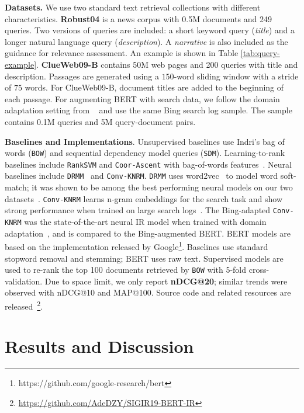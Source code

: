 \documentclass[sigconf]{acmart}
\begin{document}
\textbf{Datasets.} We use two standard text retrieval collections with different characteristics. \textbf{Robust04} is a news corpus with 0.5M documents and 249 queries. Two versions of queries are included: a short keyword query (\textit{title}) and a longer natural language query (\textit{description}). A \textit{narrative} is also included as the guidance for relevance assessment. An example is shown in Table \ref{tab:query-example}. \textbf{ClueWeb09-B} contains 50M web pages and 200 queries with title and description. Passages are generated using a $150$-word sliding window with a stride of $75$ words. For ClueWeb09-B, document titles are added to the beginning of each passage. For augmenting BERT with search data, we follow the domain adaptation setting from ~\citet{dai2018convolutional} and use the same Bing search log sample. The sample contains 0.1M queries and 5M query-document pairs.

\textbf{Baselines and Implementations}. Unsupervised baselines use Indri's bag of words (\texttt{BOW}) and sequential dependency model queries (\texttt{SDM}). 
Learning-to-rank baselines include \texttt{RankSVM} and \texttt{Coor-Ascent} with bag-of-words features~\cite{dai2018convolutional}. Neural baselines include \texttt{DRMM}~\cite{DRMM} and \texttt{Conv-KNRM}. \texttt{DRMM} uses word2vec~\cite{word2vec} to model word soft-match; it was shown to be among the best performing neural models on our two datasets~\cite{DRMM}. \texttt{Conv-KNRM} learns n-gram embeddings for the search task and show strong performance when 
trained on large search logs~\cite{dai2018convolutional}.  The Bing-adapted \texttt{Conv-KNRM} was the state-of-the-art neural IR model when trained with domain adaptation~\cite{dai2018convolutional}, and is compared to the Bing-augmented BERT. BERT models are based on the implementation released by Google\footnote{https://github.com/google-research/bert}. Baselines use standard stopword removal and stemming; BERT uses raw text. Supervised models are used to re-rank the top 100 documents retrieved by \texttt{BOW} with 5-fold cross-validation. Due to space limit, we only report \textbf{nDCG@20}; similar trends were observed with nDCG@10 and MAP@100. Source code and related resources are released~\footnote{\url{https://github.com/AdeDZY/SIGIR19-BERT-IR}}.




  \section{Results and Discussion}
\end{document}
